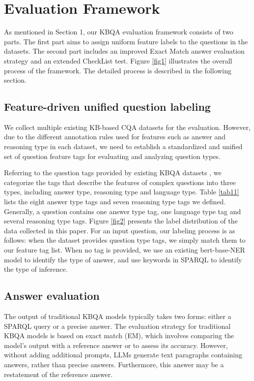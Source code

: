\documentclass[runningheads]{llncs}
\begin{document}
\section{Evaluation Framework}
As mentioned in Section 1, our KBQA evaluation framework consists of two parts. The first part aims to assign uniform feature labels to the questions in the datasets. The second part includes an improved Exact Match answer evaluation strategy and an extended CheckList test. Figure \ref{fig1} illustrates the overall process of the framework. The detailed process is described in the following section.



\subsection{Feature-driven unified question labeling}
We collect multiple existing KB-based CQA datasets for the evaluation. However, due to the different annotation rules used for features such as answer and reasoning type in each dataset, we need to establish a standardized and unified set of question feature tags for evaluating and analyzing question types.

Referring to the question tags provided by existing KBQA datasets \cite{ngomo20189th,longpre2021mkqa,cao2022kqa,yih2016value}, we categorize the tags that describe the features of complex questions into three types, including answer type, reasoning type and language type. Table \ref{tab11} lists the eight answer type tags and seven reasoning type tags we defined. Generally, a question contains one answer type tag, one language type tag and several reasoning type tags. Figure \ref{fig2} presents the label distribution of the data collected in this paper. For an input question, our labeling process is as follows: when the dataset provides question type tags, we simply match them to our feature tag list. When no tag is provided, we use an existing bert-base-NER model \cite{ner2003,kenton2019bert} to identify the type of answer, and use keywords in SPARQL to identify the type of inference.

\subsection{Answer evaluation}
The output of traditional KBQA models typically takes two forms: either a SPARQL query or a precise answer. The evaluation strategy for traditional KBQA models is based on exact match (EM), which involves comparing the model's output with a reference answer or to assess its accuracy. 
However, without adding additional prompts, LLMs generate text paragraphs containing answers, rather than precise answers. Furthermore, this answer may be a restatement of the reference answer.
\end{document}
